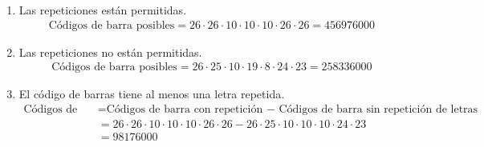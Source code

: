 \documentclass[spanish, fleqn]{article}
\begin{document}
    \begin{enumerate}
    	\item Las repeticiones están permitidas.
    	\begin{align*}
    	\text{Códigos de barra posibles}=26 \cdot 26 \cdot 10 \cdot 10 \cdot 10 \cdot 26 \cdot 26=456976000
    	\end{align*}
        \item Las repeticiones no están permitidas.
        \begin{align*}
    	\text{Códigos de barra posibles}=26 \cdot 25 \cdot 10 \cdot 19 \cdot 8 \cdot 24 \cdot 23=258336000
    	\end{align*}
        \item El código de barras tiene al menos una letra repetida.
        \begin{align*}
        \text{Códigos de barra posibles}&\text{=Códigos de barra con repetición $-$ Códigos de barra sin repetición de letras}\\
        &=26\cdot 26\cdot 10\cdot 10\cdot 10\cdot 26\cdot 26-26\cdot 25\cdot 10\cdot 10\cdot 10 \cdot 24\cdot 23\\
        &=98176000
        \end{align*}
    \end{enumerate}
	
\end{document}
